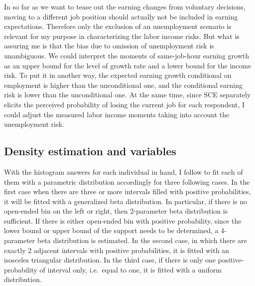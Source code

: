 \documentclass[12pt,notitlepage,onecolumn,aps,pra]{revtex4-1}
\begin{document}
In so far as we want to tease out the earning changes from voluntary
decisions, moving to a different job position should actually not be
included in earning expectations. Therefore only the exclusion of an
unemployment scenario is relevant for my purpose in characterizing the
labor income risks. But what is assuring me is that the bias due to
omission of unemployment risk is unambiguous. We could interpret the
moments of same-job-hour earning growth as an upper bound for the level
of growth rate and a lower bound for the income risk. To put it in
another way, the expected earning growth conditional on employment is
higher than the unconditional one, and the conditional earning risk is
lower than the unconditional one. At the same time, since SCE separately
elicits the perceived probability of losing the current job for each
respondent, I could adjust the measured labor income moments taking into
account the unemployment risk.

\hypertarget{density-estimation-and-variables}{%
\subsection{Density estimation and
variables}\label{density-estimation-and-variables}}

With the histogram answers for each individual in hand, I follow
\cite{engelberg_comparing_2009} to fit each of them with a parametric
distribution accordingly for three following cases. In the first case
when there are three or more intervals filled with positive
probabilities, it will be fitted with a generalized beta distribution.
In particular, if there is no open-ended bin on the left or right, then
2-parameter beta distribution is sufficient. If there is either
open-ended bin with positive probability, since the lower bound or upper
bound of the support needs to be determined, a 4-parameter beta
distribution is estimated. In the second case, in which there are
exactly 2 adjacent intervals with positive probabilities, it is fitted
with an isosceles triangular distribution. In the third case, if there
is only one positive-probability of interval only, i.e.~equal to one, it
is fitted with a uniform distribution.
\end{document}
